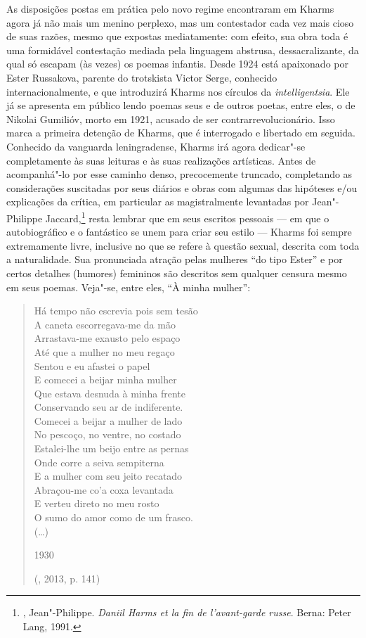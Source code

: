 As disposições postas em prática pelo novo regime encontraram em
Kharms agora já não mais um menino perplexo, mas um contestador
cada vez mais cioso de suas razões, mesmo que expostas mediatamente:
com efeito, sua obra toda é uma formidável contestação mediada pela
linguagem abstrusa, dessacralizante, da qual só escapam (às vezes)
os poemas infantis. Desde 1924 está apaixonado por Ester Russakova,
parente do trotskista Victor Serge, conhecido internacionalmente,
e que introduzirá Kharms nos círculos da \emph{intelligentsia}.
Ele já se apresenta em público lendo poemas seus e de outros
poetas, entre eles, o de Nikolai Gumilióv, morto em 1921, acusado
de ser contrarrevolucionário. Isso marca a primeira detenção de
Kharms, que é interrogado e libertado em seguida. Conhecido da
vanguarda leningradense, Kharms irá agora dedicar"-se completamente
às suas leituras e às suas realizações artísticas. Antes de
acompanhá"-lo por esse caminho denso, precocemente
truncado, completando as considerações suscitadas por seus
diários e obras com algumas das hipóteses e/ou explicações
da crítica, em particular as magistralmente levantadas por
Jean"-Philippe Jaccard,\footnote{, Jean"-Philippe.
\emph{Daniil Harms et la fin de l'avant-garde russe}. Berna: Peter
Lang, 1991.} resta lembrar que em seus escritos pessoais ---
em que o autobiográfico e o fantástico se unem para criar seu
estilo --- Kharms foi sempre extremamente livre, inclusive no
que se refere à questão sexual, descrita com toda a naturalidade.
Sua pronunciada atração pelas mulheres ``do tipo Ester'' e por certos detalhes (humores) femininos são descritos
sem qualquer censura mesmo em seus poemas. Veja"-se, entre eles,
``À minha mulher'':

\begin{verse}
Há tempo não escrevia pois sem tesão\\
A caneta escorregava-me da mão\\
Arrastava-me exausto pelo espaço\\
Até que a mulher no meu regaço\\
Sentou e eu afastei o papel\\
E comecei a beijar minha mulher\\
Que estava desnuda à minha frente\\ 
Conservando seu ar de indiferente.\\
Comecei a beijar a mulher de lado\\
No pescoço, no ventre, no costado\\
Estalei-lhe um beijo entre as pernas\\
Onde corre a seiva sempiterna\\
E a mulher com seu jeito recatado\\
Abraçou-me co’a coxa levantada\\
E verteu direto no meu rosto\\
O sumo do amor como de um frasco.\\
(\ldots{})

1930

(, 2013, p. 141)
\end{verse}

